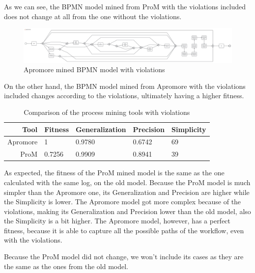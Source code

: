 As we can see, the BPMN model mined from ProM with the violations included
does not change at all from the one without the violations.

\begin{figure}[H]
\centering
\includegraphics[width=\textwidth]{figures/apromore_violations_mined.pdf}
\caption{Apromore mined BPMN model with violations}
\label{fig:apromore_violations_mined}
\end{figure}

On the other hand, the BPMN model mined from Apromore with the violations
included changes according to the violations, ultimately having a higher
fitness.

\begin{table}[H]
\centering
\begin{tabular}{|r|l|l|l|l|}
\hline
\textbf{Tool} & \textbf{Fitness} & \textbf{Generalization} & \textbf{Precision} & \textbf{Simplicity} \\
\hline
Apromore & 1 & 0.9780 & 0.6742 & 69 \\
\hline
ProM & 0.7256 & 0.9909 & 0.8941 & 39 \\
\hline
\end{tabular}
\caption{Comparison of the process mining tools with violations}
\label{tab:process_mining_comparison_violations}
\end{table}

As expected, the fitness of the ProM mined model is the same as the one calculated
with the same log, on the old model. Because the ProM model is much
simpler than the Apromore one, its Generalization and Precision are higher while
the Simplicity is lower. The Apromore model got more complex because of
the violations, making its Generalization and Precision lower than
the old model, also the Simplicity is a bit higher.
The Apromore model, however, has a perfect fitness, because it is able to
capture all the possible paths of the workflow, even with the violations.

Because the ProM model did not change, we won't include its cases as
they are the same as the ones from the old model.

